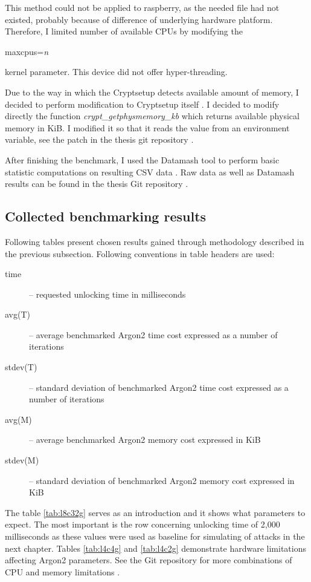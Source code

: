 \documentclass[nolof,digital]{fithesis3}
\begin{document}
This method could not be applied to raspberry, as the needed file had not existed, probably because of difference of underlying hardware platform. Therefore, I limited number of available CPUs by modifying the 
\begin{tt}
maxcpus=\emph{n}
\end{tt}
 kernel parameter. This device did not offer hyper-threading.

Due to the way in which the Cryptsetup detects available amount of memory, I decided to perform modification to Cryptsetup itself \parencite{cryptsetuputils}. I decided to modify directly the function \emph{crypt\_getphysmemory\_kb} which returns available physical memory in KiB. I modified it so that it reads the value from an environment variable, see the patch in the thesis git repository \parencite{thesisrepo}.

After finishing the benchmark, I used the Datamash tool to perform basic statistic computations on resulting CSV data \parencite{datamash}. Raw data as well as Datamash results can be found in the thesis Git repository \parencite{thesisrepo}.

\FloatBarrier

\subsection{Collected benchmarking results}
Following tables present chosen results gained through methodology described in the previous subsection. Following conventions in table headers are used:

\begin{description}
\item[time] -- requested unlocking time in milliseconds

\item[avg(T)] -- average benchmarked Argon2 time cost expressed as a number of iterations

\item[stdev(T)] -- standard deviation of benchmarked Argon2 time cost expressed as a number of iterations

\item[avg(M)] -- average benchmarked Argon2 memory cost expressed in KiB

\item[stdev(M)] -- standard deviation of benchmarked Argon2 memory cost expressed in KiB
\end{description}

The table \ref{tab:l8c32g} serves as an introduction and it shows what parameters to expect. The most important is the row concerning unlocking time of 2,000 milliseconds as these values were used as baseline for simulating of attacks in the next chapter. Tables \ref{tab:l4c4g} and \ref{tab:l4c2g} demonstrate hardware limitations affecting Argon2 parameters. See the Git repository for more combinations of CPU and memory limitations \parencite{thesisrepo}.
\end{document}
